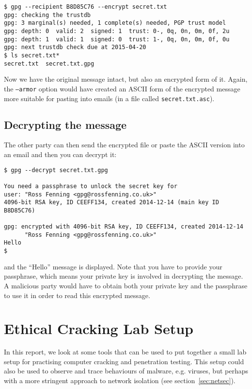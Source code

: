\documentclass{report}
\begin{document}
\begin{lstlisting}
$ gpg --recipient B8D85C76 --encrypt secret.txt
gpg: checking the trustdb
gpg: 3 marginal(s) needed, 1 complete(s) needed, PGP trust model
gpg: depth: 0  valid: 2  signed: 1  trust: 0-, 0q, 0n, 0m, 0f, 2u
gpg: depth: 1  valid: 1  signed: 0  trust: 1-, 0q, 0n, 0m, 0f, 0u
gpg: next trustdb check due at 2015-04-20
$ ls secret.txt*
secret.txt  secret.txt.gpg
\end{lstlisting}

Now we have the original message intact, but also an encrypted form of it.
Again, the \texttt{--armor} option would have created an ASCII form of
the encrypted message more suitable for pasting into emails (in a file
called \texttt{secret.txt.asc}).

\section{Decrypting the message}

The other party can then send the encrypted file or paste the ASCII version into
an email and then you can decrypt it:

\begin{lstlisting}
$ gpg --decrypt secret.txt.gpg

You need a passphrase to unlock the secret key for
user: "Ross Fenning <gpg@rossfenning.co.uk>"
4096-bit RSA key, ID CEEFF134, created 2014-12-14 (main key ID B8D85C76)

gpg: encrypted with 4096-bit RSA key, ID CEEFF134, created 2014-12-14
      "Ross Fenning <gpg@rossfenning.co.uk>"
Hello
$
\end{lstlisting}

\noindent and the ``Hello'' message is displayed. Note that you have to
provide your passphrase, which means your private key is involved in
decrypting the message. A malicious party would have to obtain both
your private key and the passphrase to use it in order to read this
encrypted message.

\chapter{Ethical Cracking Lab Setup}

In this report, we look at some tools that can be used to put together
a small lab setup for practising computer cracking and penetration
testing. This setup could also be used to observe and trace behaviours
of malware, e.g. viruses, but perhaps with a more stringent approach
to network isolation (see section~\ref{sec:netsec}).
\end{document}
